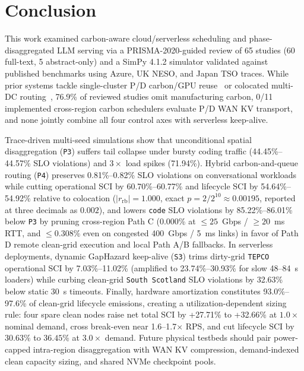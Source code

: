\section{Conclusion}\label{sec:conclusion}

This work examined carbon-aware cloud/serverless scheduling and phase-disaggregated LLM serving via a PRISMA-2020-guided review of 65 studies (60 full-text, 5 abstract-only) and a SimPy 4.1.2 simulator validated against published benchmarks using Azure, UK NESO, and Japan TSO traces. While prior systems tackle single-cluster P/D carbon/GPU reuse~\cite{shi2024greenllm} or colocated multi-DC routing~\cite{topcu2026tension,moore2025slit,zhang2026context,bernhard2026cleanest,he2025freesh,more2026cedar,cheng2026greenllm}, 76.9\% of reviewed studies omit manufacturing carbon, 0/11 implemented cross-region carbon schedulers evaluate P/D WAN KV transport, and none jointly combine all four control axes with serverless keep-alive.

Trace-driven multi-seed simulations show that unconditional spatial disaggregation (\texttt{P3}) suffers tail collapse under bursty coding traffic (44.45\%--44.57\% SLO violations) and $3\times$ load spikes (71.94\%). Hybrid carbon-and-queue routing (\texttt{P4}) preserves 0.81\%--0.82\% SLO violations on conversational workloads while cutting operational SCI by 60.70\%--60.77\% and lifecycle SCI by 54.64\%--54.92\% relative to colocation ($|r_{\text{rb}}|=1.000$, exact $p = 2/2^{10} \approx 0.00195$, reported at three decimals as $0.002$), and lowers \texttt{code} SLO violations by 85.22\%--86.01\% below \texttt{P3} by pruning cross-region Path C (0.000\% at $\le 25$~Gbps / $\ge 20$~ms RTT, and $\le 0.308\%$ even on congested 400~Gbps / 5~ms links) in favor of Path D remote clean-grid execution and local Path A/B fallbacks. In serverless deployments, dynamic GapHazard keep-alive (\texttt{S3}) trims dirty-grid \texttt{TEPCO} operational SCI by 7.03\%--11.02\% (amplified to 23.74\%--30.93\% for slow 48--84~s loaders) while curbing clean-grid \texttt{South Scotland} SLO violations by 32.63\% below static 30~s timeouts. Finally, hardware amortization constitutes 93.0\%--97.6\% of clean-grid lifecycle emissions, creating a utilization-dependent sizing rule: four spare clean nodes raise net total SCI by +27.71\% to +32.66\% at $1.0\times$ nominal demand, cross break-even near 1.6--1.7$\times$ RPS, and cut lifecycle SCI by $30.63\%$ to $36.45\%$ at $3.0\times$ demand. Future physical testbeds should pair power-capped intra-region disaggregation with WAN KV compression, demand-indexed clean capacity sizing, and shared NVMe checkpoint pools.

